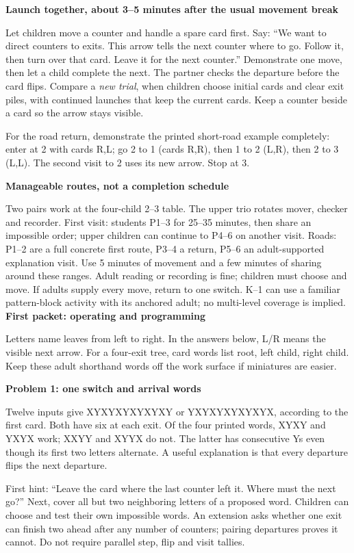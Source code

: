 \documentclass[11pt]{article}
\newcommand{\head}[1]{\vspace{3pt}\textbf{\large #1}\par}
\newcommand{\prob}[1]{\vspace{3pt}\textbf{#1}\par}
\begin{document}
\prob{Launch together, about 3--5 minutes after the usual movement break}
Let children move a counter and handle a spare card first. Say: ``We want to direct counters to exits. This arrow tells the next counter where to go. Follow it, then turn over that card. Leave it for the next counter.'' Demonstrate one move, then let a child complete the next. The partner checks the departure before the card flips. Compare a \emph{new trial}, when children choose initial cards and clear exit piles, with continued launches that keep the current cards. Keep a counter beside a card so the arrow stays visible.

For the road return, demonstrate the printed short-road example completely: enter at 2 with cards R,L; go 2 to 1 (cards R,R), then 1 to 2 (L,R), then 2 to 3 (L,L). The second visit to 2 uses its new arrow. Stop at 3.

\prob{Manageable routes, not a completion schedule}
Two pairs work at the four-child 2--3 table. The upper trio rotates mover, checker and recorder. First visit: students P1--3 for 25--35 minutes, then share an impossible order; upper children can continue to P4--6 on another visit. Roads: P1--2 are a full concrete first route, P3--4 a return, P5--6 an adult-supported explanation visit. Use 5 minutes of movement and a few minutes of sharing around these ranges. Adult reading or recording is fine; children must choose and move. If adults supply every move, return to one switch. K--1 can use a familiar pattern-block activity with its anchored adult; no multi-level coverage is implied.
\newpage
\head{First packet: operating and programming}
Letters name leaves from left to right. In the answers below, L/R means the visible next arrow. For a four-exit tree, card words list root, left child, right child. Keep these adult shorthand words off the work surface if miniatures are easier.

\prob{Problem 1: one switch and arrival words}
Twelve inputs give XYXYXYXYXYXY or YXYXYXYXYXYX, according to the first card. Both have six at each exit. Of the four printed words, XYXY and YXYX work; XXYY and XYYX do not. The latter has consecutive Ys even though its first two letters alternate. A useful explanation is that every departure flips the next departure.

First hint: ``Leave the card where the last counter left it. Where must the next go?'' Next, cover all but two neighboring letters of a proposed word. Children can choose and test their own impossible words. An extension asks whether one exit can finish two ahead after any number of counters; pairing departures proves it cannot. Do not require parallel step, flip and visit tallies.
\end{document}
